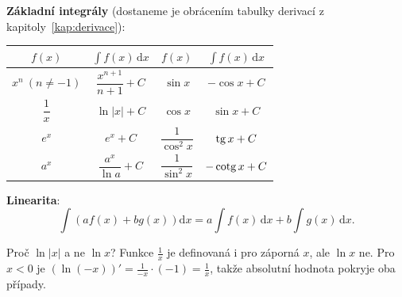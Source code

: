 \begin{center}
\end{center}

\begin{definitionbox}\label{def:zakladni-integraly}
  \textbf{Základní integrály} (dostaneme je obrácením tabulky derivací z kapitoly~\ref{kap:derivace}):
  \begin{center}
    \renewcommand{\arraystretch}{1.8}
    \begin{tabular}{|c|c||c|c|}
      \hline
      $f(x)$ & $\int f(x)\,\mathrm{d}x$ & $f(x)$ & $\int f(x)\,\mathrm{d}x$ \\
      \hline
      $x^n\ (n\neq -1)$ & $\dfrac{x^{n+1}}{n + 1} + C$ & $\sin x$ & $-\cos x + C$ \\
      $\dfrac{1}{x}$ & $\ln|x| + C$ & $\cos x$ & $\sin x + C$ \\
      $e^x$ & $e^x + C$ & $\dfrac{1}{\cos^2 x}$ & $\operatorname{tg} x + C$ \\
      $a^x$ & $\dfrac{a^x}{\ln a} + C$ & $\dfrac{1}{\sin^2 x}$ & $-\operatorname{cotg} x + C$ \\
      \hline
    \end{tabular}
  \end{center}

  \textbf{Linearita}:
  \begin{equation*}
    \int\left(af(x) + bg(x)\right)\mathrm{d}x = a\int f(x)\,\mathrm{d}x + b\int g(x)\,\mathrm{d}x.
  \end{equation*}
\end{definitionbox}

Proč $\ln|x|$ a ne $\ln x$? Funkce $\frac{1}{x}$ je definovaná i pro záporná $x$, ale $\ln x$ ne. Pro $x < 0$ je ${(\ln(-x))}' = \frac{1}{-x}\cdot(-1) = \frac{1}{x}$, takže absolutní hodnota pokryje oba případy.

